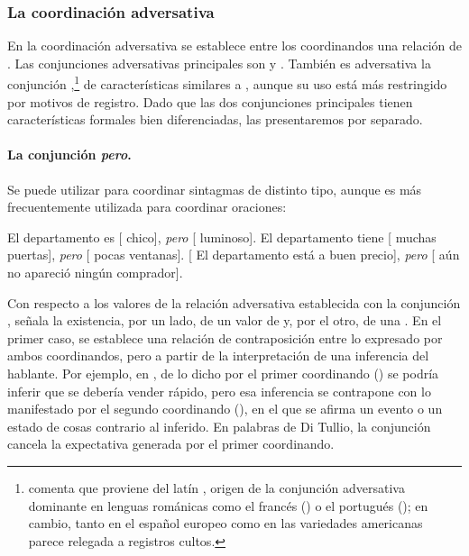 \subsubsection{La coordinación adversativa}\label{sec:12-adversativa}

En la coordinación adversativa se establece entre los coordinandos una relación
de . Las conjunciones adversativas principales son  y
. También es adversativa la conjunción
,\footnote{\textcite[197]{jimenezjulia2023} comenta que 
proviene del latín , origen de la conjunción adversativa dominante
en lenguas románicas como el francés () o el portugués
(); en cambio, tanto en el español europeo como en las variedades
americanas parece relegada a registros cultos.} de características similares a
, aunque su uso está más restringido por motivos de registro. Dado
que las dos conjunciones principales tienen características formales bien
diferenciadas, las presentaremos por separado.

\paragraph{La conjunción \textit{pero}.}\label{sec:12-pero}
Se puede utilizar para coordinar sintagmas de distinto tipo, aunque es más
frecuentemente utilizada para coordinar oraciones:

\begin{exe}
  \ex
    \begin{xlist}
      \ex\label{ex:12-depto-a} El departamento es [ chico], \textit{pero}
          [ luminoso].
      \ex El departamento tiene [ muchas puertas], \textit{pero}
          [ pocas ventanas].
      \ex\label{ex:12-depto-c} {}[ El departamento está a buen precio],
          \textit{pero} [ aún no apareció ningún comprador].
    \end{xlist}
\end{exe}

Con respecto a los valores de la relación adversativa establecida con la
conjunción , \textcite[284]{ditullio2014} señala la existencia, por
un lado, de un valor de  y, por el otro, de una
. En el primer caso, se establece una relación de
contraposición entre lo expresado por ambos coordinandos, pero a partir de la
interpretación de una inferencia del hablante. Por ejemplo, en
, de lo dicho por el primer coordinando () se podría inferir que se debería vender
rápido, pero esa inferencia se contrapone con lo manifestado por el segundo
coordinando (), en el que se afirma un
evento o un estado de cosas contrario al inferido. En palabras de Di Tullio, la
conjunción  cancela la expectativa generada por el primer
coordinando.

